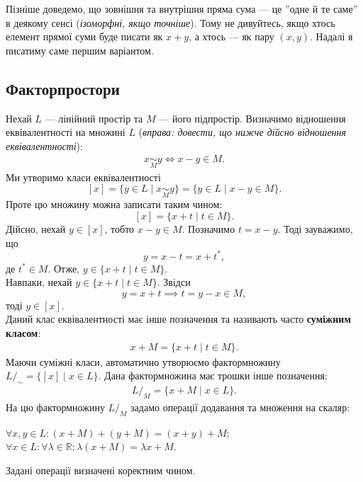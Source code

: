 \documentclass{math_library}
\begin{document}
	\begin{remark}
	Пізніше доведемо, що зовнішня та внутрішня пряма сума --- це ''одне й те саме'' в деякому сенсі (\textit{ізоморфні, якщо точніше}). Тому не дивуйтесь, якщо хтось елемент прямої суми буде писати як $x+y$, а хтось --- як пару $(x,y)$. Надалі я писатиму саме першим варіантом.
	\end{remark}
	
	\subsection{Факторпростори}
	Нехай $L$ --- лінійний простір та $M$ --- його підпростір. Визначимо відношення еквівалентності на множині $L$ (\textit{вправа: довести, що нижче дійсно відношення еквівалентності}):
	\begin{align*}
	x \underset{M}{\sim} y \iff x-y \in M.
	\end{align*}
	Ми утворимо класи еквівалентності 
	\[
	[x] = \{y \in L \mid x \underset{M}{\sim} y \} = \{ y \in L \mid x-y \in M\}.
	\]
	Проте цю множину можна записати таким чином:
	\[
	[x] = \{x+t \mid t \in M\}.
	\]
	Дійсно, нехай $y \in [x]$, тобто $x-y \in M$. Позначимо $t = x-y$. Тоді зауважимо, що 
	\[
	y = x-t = x + t^*,
	\]
	де $t^* \in M$. Отже, $y \in \{x+t \mid t \in M\}$.\\
	Навпаки, нехай $y \in \{x+t \mid t \in M\}$. Звідси 
	\[
	y = x+t \implies t = y-x \in M,
	\]
	тоді $y \in [x]$.\\
	Даний клас еквівалентності має інше позначення та називають часто \textbf{суміжним класом}:
	\begin{align*}
	x + M = \{ x + t \mid t \in M\}.
	\end{align*}
	Маючи суміжні класи, автоматично утворюємо фактормножину $L/_{\sim} = \{ [x] \mid x \in L\}$. Дана фактормножина має трошки інше позначення:
	\begin{align*}
	L/_M = \{x + M \mid x \in L\}.
	\end{align*}
	На цю фактормножину $L/_M$ задамо операції додавання та множення на скаляр:
	\begin{center}
	$\forall x,y \in L: (x+M)+(y+M) = (x+y)+M$;\\
	$\forall x \in L: \forall \lambda \in \mathbb{R}: \lambda(x+M) = \lambda x + M$.
	\end{center}
	
	\begin{lemma}
	Задані операції визначені коректним чином.
	\end{lemma}
	
\end{document}
